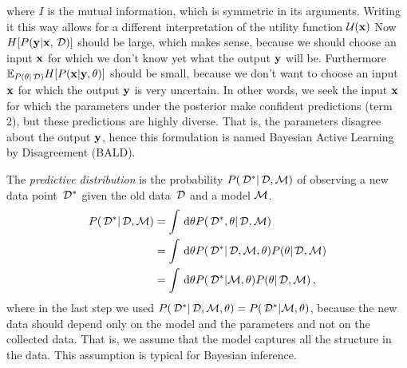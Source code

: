 where $I$ is the mutual information, which is symmetric in its arguments. Writing it this way allows for a different interpretation of the utility function $\mathcal{U}({\bf x})$
Now $H[{P({\bf y} | {\bf x}, \,\mathcal{D})}]$ should be large, which makes sense, because we should choose an input ${\bf x}$ for which we don't know yet what the output ${\bf y}$ will be. Furthermore $\mathbb{E}_{{P(\theta | \,\mathcal{D})}} H[{P({\bf x} | {\bf y}, \theta)}]$ should be small, because we don't want to choose an input ${\bf x}$ for which the output ${\bf y}$ is very uncertain.
In other words, we seek the input ${\bf x}$ for which the parameters under the posterior make confident predictions (term 2), but these predictions are highly diverse. That is, the parameters disagree about the output ${\bf y}$, hence this formulation is named Bayesian Active Learning by Disagreement (BALD).

The \emph{predictive distribution} is the probability ${P(\,\mathcal{D}^* | \,\mathcal{D}, \mathcal{M})}$ of observing a new data point $\,\mathcal{D}^*$ given the old data $\,\mathcal{D}$ and a model $\mathcal{M}$.
\begin{align*}
	{P(\,\mathcal{D}^* | \,\mathcal{D}, \mathcal{M})}
	&= \int \,\mathrm{d} \theta
		{P(\,\mathcal{D}^*, \theta| \,\mathcal{D}, \mathcal{M})} \\
	&= \int \,\mathrm{d} \theta
		{P(\,\mathcal{D}^* | \,\mathcal{D}, \mathcal{M}, \theta)}
		{P(\theta| \,\mathcal{D}, \mathcal{M})} \\
	&= \int \,\mathrm{d} \theta
		{P(\,\mathcal{D}^* | \mathcal{M}, \theta)}
		{P(\theta| \,\mathcal{D}, \mathcal{M})} \,,
\end{align*}
where in the last step we used ${P(\,\mathcal{D}^* | \,\mathcal{D}, \mathcal{M}, \theta)} = {P(\,\mathcal{D}^* | \mathcal{M}, \theta)}$, because the new data should depend only on the model and the parameters and not on the collected data. That is, we assume that the model captures all the structure in the data. This assumption is typical for Bayesian inference.
